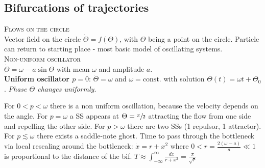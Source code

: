\subsection{Bifurcations of trajectories}
\textsc{Flows on the circle}\\
Vector field on the circle $\dot{\Theta}=f(\Theta)$, with $\Theta$ being a point on the circle. Particle can return to starting place - most basic model of oscillating systems.\\

\textsc{Non-uniform oscillator}\\
$\dot{\Theta} = \omega - a\sin \Theta$ with mean $\omega$ and amplitude $a$.\\
\textbf{Uniform oscillator $p=0$}: $\dot{\Theta} = \omega$ and $\omega=\text{const.}$ with solution $\Theta(t)=\omega t + \Theta_0$. \emph{Phase $\Theta$ changes uniformly}.\\
\begin{center}
\end{center}

For $0<p<\omega$ there is a non uniform oscillation, because the velocity depends on the angle. For $p=\omega$ a SS appears at $\Theta=\sfrac{\pi}{2}$ attracting the flow from one side and repelling the other side. For $p>\omega$ there are two SSs (1 repulsor, 1 attractor).\\
For $p\lesssim\omega$ there exists a saddle-note ghost. Time to pass through the bottleneck via local rescaling around the bottleneck: $\dot{x}=r+x^2$ where $0<r = \frac{2(\omega-a)}{a}\ll 1$ is proportional to the distance of the bif. $T\approx
\int_{-\infty}^{\infty} \frac{dx}{r+x^2} = \frac{\pi}{\sqrt{r}}$

\begin{center}
\end{center}

